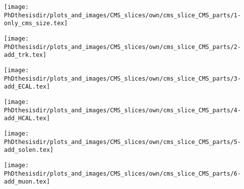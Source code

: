 \begin{frame}
\end{frame}

\begin{frame}
\addtocounter{framenumber}{-1}
\transwipe
{}
\begin{center}
\texttt{[image: \\PhDthesisdir/plots\_and\_images/CMS\_slices/own/cms\_slice\_CMS\_parts/1-only\_cms\_size.tex]}
\end{center}
\end{frame}

\begin{frame}
\addtocounter{framenumber}{-1}
\transdissolve
{}
\begin{center}
\texttt{[image: \\PhDthesisdir/plots\_and\_images/CMS\_slices/own/cms\_slice\_CMS\_parts/2-add\_trk.tex]}
\end{center}
\end{frame}

\begin{frame}
\addtocounter{framenumber}{-1}
\transdissolve
{}
\begin{center}
\texttt{[image: \\PhDthesisdir/plots\_and\_images/CMS\_slices/own/cms\_slice\_CMS\_parts/3-add\_ECAL.tex]}
\end{center}
\end{frame}

\begin{frame}
\addtocounter{framenumber}{-1}
\transdissolve
{}
\begin{center}
\texttt{[image: \\PhDthesisdir/plots\_and\_images/CMS\_slices/own/cms\_slice\_CMS\_parts/4-add\_HCAL.tex]}
\end{center}
\end{frame}

\begin{frame}
\addtocounter{framenumber}{-1}
\transdissolve
{}
\begin{center}
\texttt{[image: \\PhDthesisdir/plots\_and\_images/CMS\_slices/own/cms\_slice\_CMS\_parts/5-add\_solen.tex]}
\end{center}
\end{frame}

\begin{frame}
\addtocounter{framenumber}{-1}
\transdissolve
{}
\begin{center}
\texttt{[image: \\PhDthesisdir/plots\_and\_images/CMS\_slices/own/cms\_slice\_CMS\_parts/6-add\_muon.tex]}
\end{center}
\end{frame}

